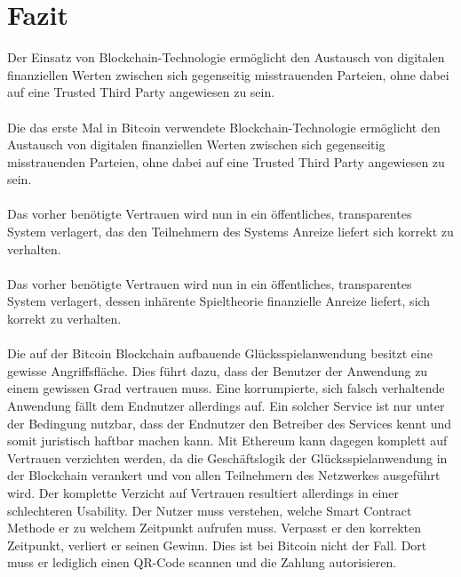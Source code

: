 \chapter{Fazit} %
Der Einsatz von Blockchain-Technologie ermöglicht
den Austausch von digitalen finanziellen Werten zwischen sich gegenseitig misstrauenden Parteien, ohne dabei auf eine Trusted Third Party angewiesen zu sein.\\\\

Die das erste Mal in Bitcoin verwendete Blockchain-Technologie ermöglicht 
den Austausch von digitalen finanziellen Werten zwischen sich gegenseitig misstrauenden Parteien, ohne dabei auf eine Trusted Third Party angewiesen zu sein.\\\\


Das vorher benötigte Vertrauen wird nun in ein öffentliches, transparentes System verlagert, das den Teilnehmern des Systems Anreize liefert sich korrekt zu verhalten.\\\\

Das vorher benötigte Vertrauen wird nun in ein öffentliches, transparentes System verlagert, dessen inhärente Spieltheorie finanzielle Anreize liefert, sich korrekt zu verhalten.\\\\

Die auf der Bitcoin Blockchain aufbauende Glücksspielanwendung besitzt eine gewisse Angriffsfläche. Dies führt dazu, dass der Benutzer der Anwendung zu einem gewissen Grad vertrauen muss. Eine korrumpierte, sich falsch verhaltende Anwendung fällt dem Endnutzer allerdings auf. Ein solcher Service ist nur unter der Bedingung nutzbar, dass der Endnutzer den Betreiber des Services kennt und somit juristisch haftbar machen kann. 
Mit Ethereum kann dagegen komplett auf Vertrauen verzichten werden, da die Geschäftslogik der Glücksspielanwendung in der Blockchain verankert und von allen Teilnehmern des Netzwerkes ausgeführt wird. Der komplette Verzicht auf Vertrauen resultiert allerdings in einer schlechteren Usability. Der Nutzer muss verstehen, welche Smart Contract Methode er zu welchem Zeitpunkt aufrufen muss. Verpasst er den korrekten Zeitpunkt, verliert er seinen Gewinn. Dies ist bei Bitcoin nicht der Fall. Dort muss er lediglich einen QR-Code scannen und die Zahlung autorisieren.\\\\\\



